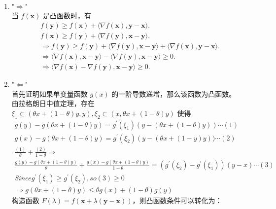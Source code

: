 \documentclass[11pt,letter,notitlepage]{article}
\begin{document}
\begin{solution}
	\heiti
	\ \\
	\begin{enumerate}
		\item "$\Rightarrow$"\\
			当 $f(\mathbf{x})$ 是凸函数时，有 
			\begin{align*}
				f(\mathbf{y}) \geq f(\mathbf{x}) + \langle \nabla f(\mathbf{x}) , \mathbf{y} - \mathbf{x} \rangle.\\
				f(\mathbf{x}) \geq f(\mathbf{y}) + \langle \nabla f(\mathbf{y}) , \mathbf{x} - \mathbf{y} \rangle.\\
				\Rightarrow f(\mathbf{y}) \geq f(\mathbf{y}) + \langle \nabla f(\mathbf{y}) , \mathbf{x} - \mathbf{y} \rangle + \langle \nabla f(\mathbf{x}) , \mathbf{y} - \mathbf{x} \rangle.\\
				\Rightarrow \langle \nabla f(\mathbf{x}) , \mathbf{x} - \mathbf{y} \rangle - \langle \nabla f(\mathbf{y}) , \mathbf{x} - \mathbf{y} \rangle \geq 0.\\
				\Rightarrow \langle \nabla f(\mathbf{x}) - \nabla f(\mathbf{y}) , \mathbf{x} - \mathbf{y} \rangle \geq 0.
			\end{align*}
		\item "$\Leftarrow$"\\
		首先证明如果单变量函数 $g(x)$ 的一阶导数递增，那么该函数为凸函数。\\
		由拉格朗日中值定理，存在$\xi_1 \subset (\theta x+(1-\theta) y, y), \xi_2 \subset (x, \theta x+(1-\theta) y)$ 使得
		$$
		\begin{array}{l}{g(y)-g(\theta x+(1-\theta) y)=g^{\prime}\left(\xi_{1}\right)(y-(\theta x+(1-\theta) y)) \cdots (1)} \\ {g(x)-g(\theta x+(1-\theta) y)=g^{\prime}\left(\xi_{2}\right)\left(y-(\theta x+(1-y) y)) \cdots (2)\right.} \\ {\frac{(1)}{\theta}+\frac{(2)}{1-\theta} \Rightarrow} \\ {\frac{g(y)-g(\theta x+(1-\theta) y)}{\theta}+\frac{g(x)-g(\theta x+(1-\theta) y)}{1-\theta}=\left(g^{\prime}\left(\xi_{2}\right)-g^{\prime}\left(\xi_{1}\right)\right)(y - x) \cdots (3)} \\Since {g^{\prime}\left(\xi_{1}\right) \geqslant g^{\prime}\left(\xi_{2}\right)}, so (3) \geq 0 \\ {\Rightarrow g(\theta x+(1-\theta) y) \leqslant \theta g(x)+(1-\theta) g(y)}\end{array}
		$$
		构造函数 $  F(\lambda) = f(\mathbf{x} + \lambda(\mathbf{y}-\mathbf{x}))$，则凸函数条件可以转化为：

\end{enumerate}
\end{solution}
\end{document}
